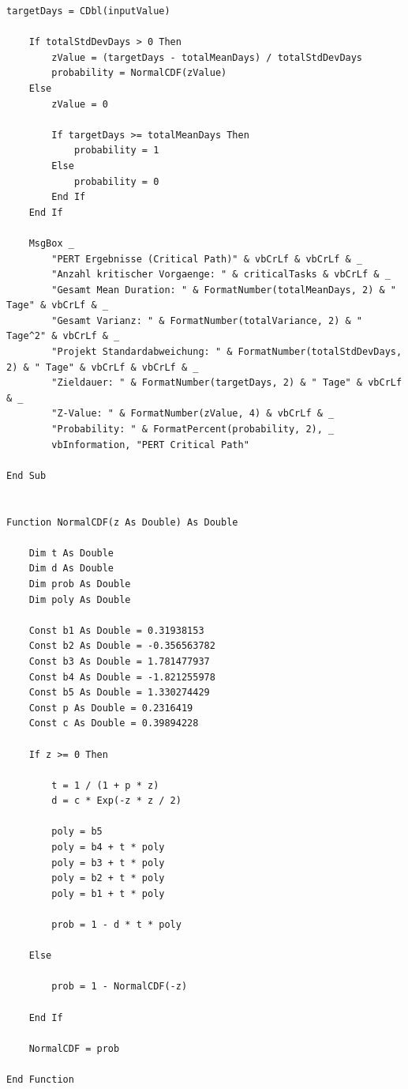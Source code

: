 \begin{lstlisting}[caption={VBA-Makro \texttt{PERTCriticalPathFullStats} fuer Microsoft Project},label={lst:pertcriticalpathfullstats}]
    targetDays = CDbl(inputValue)

    If totalStdDevDays > 0 Then
        zValue = (targetDays - totalMeanDays) / totalStdDevDays
        probability = NormalCDF(zValue)
    Else
        zValue = 0
        
        If targetDays >= totalMeanDays Then
            probability = 1
        Else
            probability = 0
        End If
    End If

    MsgBox _
        "PERT Ergebnisse (Critical Path)" & vbCrLf & vbCrLf & _
        "Anzahl kritischer Vorgaenge: " & criticalTasks & vbCrLf & _
        "Gesamt Mean Duration: " & FormatNumber(totalMeanDays, 2) & " Tage" & vbCrLf & _
        "Gesamt Varianz: " & FormatNumber(totalVariance, 2) & " Tage^2" & vbCrLf & _
        "Projekt Standardabweichung: " & FormatNumber(totalStdDevDays, 2) & " Tage" & vbCrLf & vbCrLf & _
        "Zieldauer: " & FormatNumber(targetDays, 2) & " Tage" & vbCrLf & _
        "Z-Value: " & FormatNumber(zValue, 4) & vbCrLf & _
        "Probability: " & FormatPercent(probability, 2), _
        vbInformation, "PERT Critical Path"

End Sub


Function NormalCDF(z As Double) As Double

    Dim t As Double
    Dim d As Double
    Dim prob As Double
    Dim poly As Double
    
    Const b1 As Double = 0.31938153
    Const b2 As Double = -0.356563782
    Const b3 As Double = 1.781477937
    Const b4 As Double = -1.821255978
    Const b5 As Double = 1.330274429
    Const p As Double = 0.2316419
    Const c As Double = 0.39894228

    If z >= 0 Then
    
        t = 1 / (1 + p * z)
        d = c * Exp(-z * z / 2)
        
        poly = b5
        poly = b4 + t * poly
        poly = b3 + t * poly
        poly = b2 + t * poly
        poly = b1 + t * poly
        
        prob = 1 - d * t * poly
        
    Else
    
        prob = 1 - NormalCDF(-z)
        
    End If
    
    NormalCDF = prob

End Function
\end{lstlisting}
